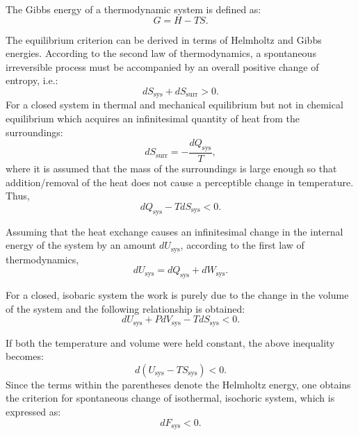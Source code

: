     The Gibbs energy of a thermodynamic system is defined as:
    \begin{equation}
        G = H - TS.
    \end{equation}

    The equilibrium criterion can be derived in terms of Helmholtz and Gibbs energies. According to the second law of thermodynamics, a spontaneous irreversible process must be accompanied by an overall positive change of entropy, i.e.:
    \begin{equation}
        dS_\text{sys} + dS_\text{surr} > 0.
    \end{equation}
    For a closed system in thermal and mechanical equilibrium but not in chemical equilibrium which acquires an infinitesimal quantity of heat from the surroundings:
    \begin{equation}
        dS_\text{surr} = -\frac{dQ_\text{sys}}{T},
    \end{equation}
    where it is assumed that the mass of the surroundings is large enough so that addition/removal of the heat does not cause a perceptible change in temperature. Thus,
    \begin{equation}
        {dQ_\text{sys}} - T dS_\text{sys}  < 0.
    \end{equation}

    Assuming that the heat exchange causes an infinitesimal change in the internal energy of the system by an amount $dU_\text{sys}$, according to the first law of thermodynamics,
    \begin{equation}
        {dU_\text{sys}} = {dQ_\text{sys}} + {dW_\text{sys}}.
    \end{equation}

    For a closed, isobaric system the work is purely due to the change in the volume of the system and the following relationship is obtained:
    \begin{equation}
        {dU_\text{sys}} + P{dV_\text{sys}} - T{dS_\text{sys}} < 0.
    \end{equation}

    If both the temperature and volume were held constant, the above inequality becomes:
    \begin{equation}
        d \left(U_\text{sys} - TS_\text{sys} \right) < 0.
    \end{equation}
    Since the terms within the parentheses denote the Helmholtz energy, one obtains the criterion for spontaneous change of isothermal, isochoric system, which is expressed as:
    \begin{equation}
        d{F_\text{sys} } < 0.
    \end{equation}

